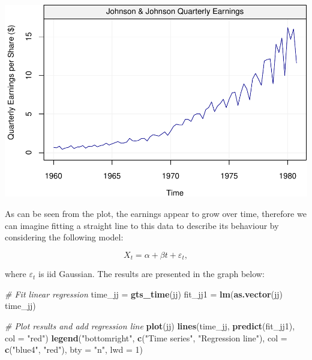 \documentclass[]{book}
\newenvironment{Shaded}{\begin{snugshade}}{\end{snugshade}}
\newcommand{\CommentTok}[1]{\textcolor[rgb]{0.56,0.35,0.01}{\textit{#1}}}
\newcommand{\DataTypeTok}[1]{\textcolor[rgb]{0.13,0.29,0.53}{#1}}
\newcommand{\DecValTok}[1]{\textcolor[rgb]{0.00,0.00,0.81}{#1}}
\newcommand{\KeywordTok}[1]{\textcolor[rgb]{0.13,0.29,0.53}{\textbf{#1}}}
\newcommand{\NormalTok}[1]{#1}
\newcommand{\OperatorTok}[1]{\textcolor[rgb]{0.81,0.36,0.00}{\textbf{#1}}}
\newcommand{\StringTok}[1]{\textcolor[rgb]{0.31,0.60,0.02}{#1}}
\theoremstyle{definition}
\theoremstyle{definition}
\theoremstyle{definition}
\theoremstyle{remark}
\begin{document}
\begin{center}\includegraphics{ts_files/figure-latex/jjexample-1} \end{center}

As can be seen from the plot, the earnings appear to grow over time,
therefore we can imagine fitting a straight line to this data to
describe its behaviour by considering the following model:

\begin{equation} 
X_t = \alpha + \beta t + \varepsilon_t,
\label{eq:modeljjexample}
\end{equation}

where \(\varepsilon_t\) is iid Gaussian. The results are presented in
the graph below:

\begin{Shaded}
\begin{Highlighting}[]
\CommentTok{# Fit linear regression}
\NormalTok{time_jj =}\StringTok{ }\KeywordTok{gts_time}\NormalTok{(jj)}
\NormalTok{fit_jj1 =}\StringTok{ }\KeywordTok{lm}\NormalTok{(}\KeywordTok{as.vector}\NormalTok{(jj) }\OperatorTok{~}\StringTok{ }\NormalTok{time_jj)}

\CommentTok{# Plot results and add regression line}
\KeywordTok{plot}\NormalTok{(jj)}
\KeywordTok{lines}\NormalTok{(time_jj, }\KeywordTok{predict}\NormalTok{(fit_jj1), }\DataTypeTok{col =} \StringTok{"red"}\NormalTok{)}
\KeywordTok{legend}\NormalTok{(}\StringTok{"bottomright"}\NormalTok{, }\KeywordTok{c}\NormalTok{(}\StringTok{"Time series"}\NormalTok{, }\StringTok{"Regression line"}\NormalTok{), }
       \DataTypeTok{col =} \KeywordTok{c}\NormalTok{(}\StringTok{"blue4"}\NormalTok{, }\StringTok{"red"}\NormalTok{), }\DataTypeTok{bty =} \StringTok{"n"}\NormalTok{, }\DataTypeTok{lwd =} \DecValTok{1}\NormalTok{)}
\end{Highlighting}
\end{Shaded}
\end{document}
